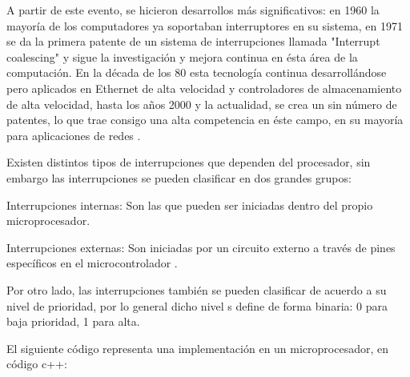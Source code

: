 \documentclass[12pt,a4paper]{report}
\begin{document}
  \vspace{1cm}
  
    A partir de este evento, se hicieron desarrollos más significativos: en 1960 la mayoría de los computadores ya soportaban interruptores en su sistema, en 1971 se da la primera patente de un sistema de interrupciones llamada "Interrupt coalescing" y sigue la investigación y mejora continua en ésta área de la computación. En la década de los 80 esta tecnología continua desarrollándose pero aplicados en Ethernet de alta velocidad y controladores de almacenamiento de alta velocidad, hasta los años 2000 y la actualidad, se crea un sin número de patentes, lo que trae consigo una alta competencia en éste campo, en su mayoría para aplicaciones de redes \cite{Irfan Ahmad 2014}.
      
     
   
   \vspace{1cm}
   
       Existen distintos tipos de interrupciones que dependen del procesador, sin embargo las interrupciones se pueden clasificar en dos grandes grupos:
       
   \vspace{1cm}
       
       Interrupciones internas: Son las que pueden ser iniciadas dentro del propio microprocesador.
       
   \vspace{1cm}
 
       Interrupciones externas: Son iniciadas por un circuito externo a través de pines específicos en el microcontrolador \cite{Rufino J. 2011}.
       
    \vspace{1cm}    
    Por otro lado, las interrupciones también se pueden clasificar de acuerdo a su nivel de prioridad, por lo general dicho nivel s define de forma binaria: 0 para baja prioridad, 1 para alta.
    
    \vspace{1cm}
    
    El siguiente código representa una implementación en un microprocesador, en código c++:
    
    \vspace{1cm}
    
\end{document}
